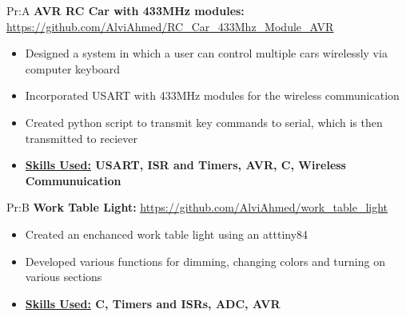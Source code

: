 
Pr:A
\vspace{\spaces}
\textbf{AVR RC Car with 433MHz modules: }
\underline{\url{https://github.com/AlviAhmed/RC_Car_433Mhz_Module_AVR}}
\begin{itemize}[noitemsep,nolistsep]
\item Designed a system in which a user can control multiple cars wirelessly
  via computer keyboard
\item Incorporated USART with 433MHz modules for the wireless communication
\item Created python script to transmit key commands to serial, which is then transmitted to reciever
\item \textbf{\underline{Skills Used:} USART, ISR and Timers, AVR, C, Wireless Communuication }
\end{itemize} 

 
Pr:B
\vspace{\spaces}
\textbf{Work Table Light: }
\underline{\url{https://github.com/AlviAhmed/work_table_light}}
\begin{itemize}[noitemsep,nolistsep]
\item Created an enchanced work table light using an atttiny84
\item Developed various functions for dimming, changing colors and turning on various sections 
\item \textbf{ \underline{Skills Used:} C, Timers and ISRs, ADC, AVR}
\end{itemize} 


